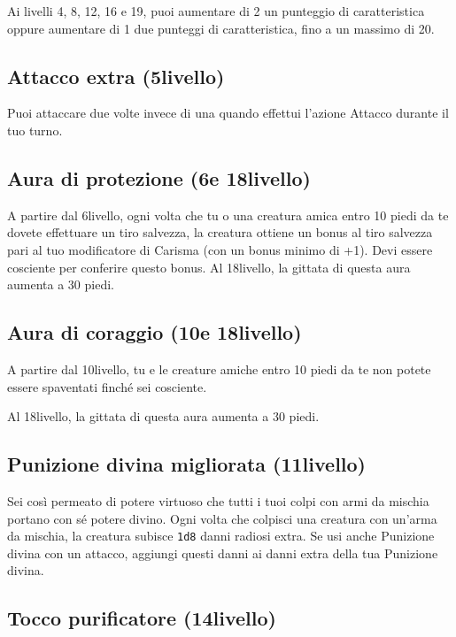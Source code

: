 \documentclass[a4paper,10pt,twoside,twocolumn,openany,bg=full,nodeprecatedcode]{dndbook}
\begin{document}
Ai livelli 4, 8, 12, 16 e 19, puoi aumentare di 2 un punteggio di caratteristica oppure aumentare di 1 due punteggi di caratteristica, fino a un massimo di 20.

\subsection{Attacco extra (5\degree livello)}

Puoi attaccare due volte invece di una quando effettui l'azione Attacco durante il tuo turno.

\subsection{Aura di protezione (6\degree e 18\degree livello)}

A partire dal 6\degree livello, ogni volta che tu o una creatura amica entro 10 piedi da te dovete effettuare un tiro salvezza, la creatura ottiene un bonus al tiro salvezza pari al tuo modificatore di Carisma (con un bonus minimo di +1).
Devi essere cosciente per conferire questo bonus.
Al 18\degree livello, la gittata di questa aura aumenta a 30 piedi.

\subsection{Aura di coraggio (10\degree e 18\degree livello)}

A partire dal 10\degree livello, tu e le creature amiche entro 10 piedi da te non potete essere spaventati finché sei cosciente.

Al 18\degree livello, la gittata di questa aura aumenta a 30 piedi.

\subsection{Punizione divina migliorata (11\degree livello)}

Sei così permeato di potere virtuoso che tutti i tuoi colpi con armi da mischia portano con sé potere divino.
Ogni volta che colpisci una creatura con un'arma da mischia, la creatura subisce \texttt{1d8} danni radiosi extra.
Se usi anche Punizione divina con un attacco, aggiungi questi danni ai danni extra della tua Punizione divina.

\subsection{Tocco purificatore (14\degree livello)}
\end{document}
